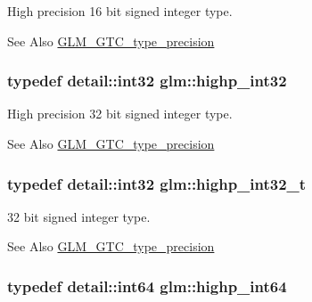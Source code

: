 High precision 16 bit signed integer type. \begin{DoxySeeAlso}{See Also}
\hyperlink{group__gtc__type__precision}{G\-L\-M\-\_\-\-G\-T\-C\-\_\-type\-\_\-precision} 
\end{DoxySeeAlso}
\hypertarget{group__gtc__type__precision_gaa2045c92b9553d463191af6a20e997bb}{
\subsubsection[{highp\-\_\-int32}]{\setlength{\rightskip}{0pt plus 5cm}typedef detail\-::int32 {\bf glm\-::highp\-\_\-int32}}}\label{group__gtc__type__precision_gaa2045c92b9553d463191af6a20e997bb}
High precision 32 bit signed integer type. \begin{DoxySeeAlso}{See Also}
\hyperlink{group__gtc__type__precision}{G\-L\-M\-\_\-\-G\-T\-C\-\_\-type\-\_\-precision} 
\end{DoxySeeAlso}
\hypertarget{group__gtc__type__precision_ga783d077a513c1f475f6cdb406b4238c3}{
\subsubsection[{highp\-\_\-int32\-\_\-t}]{\setlength{\rightskip}{0pt plus 5cm}typedef detail\-::int32 {\bf glm\-::highp\-\_\-int32\-\_\-t}}}\label{group__gtc__type__precision_ga783d077a513c1f475f6cdb406b4238c3}
32 bit signed integer type. \begin{DoxySeeAlso}{See Also}
\hyperlink{group__gtc__type__precision}{G\-L\-M\-\_\-\-G\-T\-C\-\_\-type\-\_\-precision} 
\end{DoxySeeAlso}
\hypertarget{group__gtc__type__precision_ga7ffb27943e9569800979081bc548621c}{
\subsubsection[{highp\-\_\-int64}]{\setlength{\rightskip}{0pt plus 5cm}typedef detail\-::int64 {\bf glm\-::highp\-\_\-int64}}}\label{group__gtc__type__precision_ga7ffb27943e9569800979081bc548621c}
